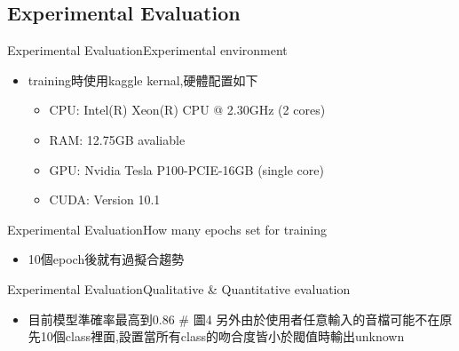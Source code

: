\documentclass{beamer}
\begin{document}
\begin{CJK}{UTF8}{bsmi}
\section{Experimental Evaluation}
\begin{frame}{Experimental Evaluation}{Experimental environment}
  \begin{itemize}
  \item {
    training時使用kaggle kernal,硬體配置如下
\begin{itemize}
  \item {
    CPU: Intel(R) Xeon(R) CPU @ 2.30GHz (2 cores)
  }
  \item {
    RAM: 12.75GB avaliable
  }
  \item {
    GPU: Nvidia Tesla P100-PCIE-16GB (single core) 
  }
 \item {
    CUDA: Version 10.1
  }
  \end{itemize}
  }
  \end{itemize}
\end{frame}
\begin{frame}{Experimental Evaluation}{How many epochs set for training}
  \begin{itemize}
  \item {
    10個epoch後就有過擬合趨勢
  }
  \end{itemize}
\end{frame}
\begin{frame}{Experimental Evaluation}{Qualitative \& Quantitative evaluation}
  \begin{itemize}
  \item {
    目前模型準確率最高到0.86 \# 圖4 另外由於使用者任意輸入的音檔可能不在原先10個class裡面,設置當所有class的吻合度皆小於閥值時輸出unknown
  }
  \end{itemize}
\end{frame}
\end{CJK}
\end{document}
